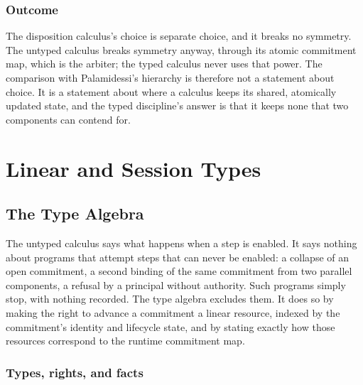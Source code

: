 \documentclass[11pt,openany]{book}
\theoremstyle{remark}
\begin{document}
\section{Outcome}

The disposition calculus's choice is separate choice, and it breaks no
symmetry. The untyped calculus breaks symmetry anyway, through its atomic
commitment map, which is the arbiter; the typed calculus never uses that
power. The comparison with Palamidessi's hierarchy is therefore not a
statement about choice. It is a statement about where a calculus keeps
its shared, atomically updated state, and the typed discipline's answer is
that it keeps none that two components can contend for.

\part{Linear and Session Types}

\chapter{The Type Algebra}
\label{ch:types}

The untyped calculus says what happens when a step is enabled. It says
nothing about programs that attempt steps that can never be enabled: a
collapse of an open commitment, a second binding of the same commitment
from two parallel components, a refusal by a principal without authority.
Such programs simply stop, with nothing recorded. The type algebra
excludes them. It does so by making the right to advance a commitment a
linear resource, indexed by the commitment's identity and lifecycle state,
and by stating exactly how those resources correspond to the runtime
commitment map.

\section{Types, rights, and facts}
\end{document}
